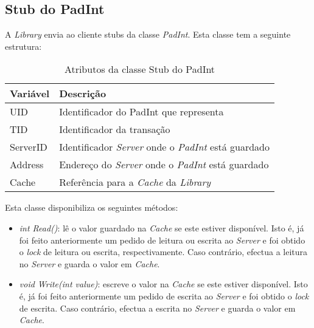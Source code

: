 \subsection{Stub do PadInt}
\label{Stub do PadInt}

A \textit{Library} envia ao cliente stubs da classe \textit{PadInt}. Esta classe tem a seguinte estrutura:

\begin{table}[H]
\centering
\begin{tabular}{| p{2cm} | p{} |}
\hline
\textbf{Variável} & \textbf{Descrição} \\
\hline
UID & Identificador do PadInt que representa \\
\hline
TID & Identificador da transação \\
\hline
ServerID & Identificador \textit{Server} onde o \textit{PadInt} está guardado \\
\hline
Address & Endereço do \textit{Server} onde o \textit{PadInt} está guardado \\
\hline
Cache & Referência para a  \textit{Cache} da \textit{Library} \\
\hline
\end{tabular}
\caption{Atributos da classe Stub do PadInt}
\end{table}

Esta classe disponibiliza os seguintes métodos:

\begin{itemize}
	\item \textit{int Read()}: lê o valor guardado na \textit{Cache} se este estiver disponível. Isto é, já foi feito anteriormente um pedido de leitura ou escrita ao \textit{Server} e foi obtido o \textit{lock} de leitura ou escrita, respectivamente. Caso contrário, efectua a leitura no \textit{Server} e guarda o valor em \textit{Cache}.
	\item \textit{void Write(int value)}: escreve o valor na \textit{Cache} se este estiver disponível. Isto é, já foi feito anteriormente um pedido de escrita ao \textit{Server} e foi obtido o \textit{lock} de escrita. Caso contrário, efectua a escrita no \textit{Server} e guarda o valor em \textit{Cache}.
\end{itemize}